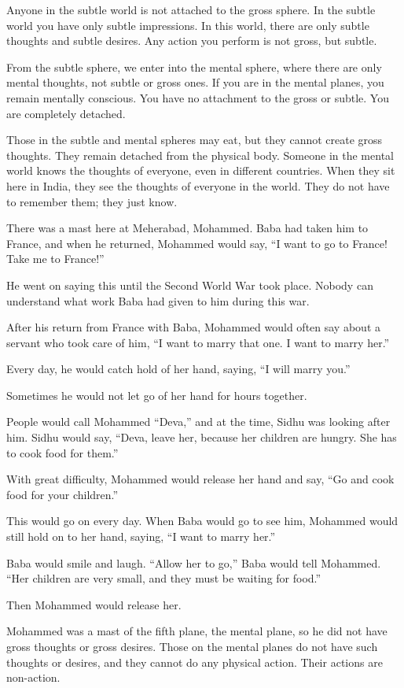 Anyone in the subtle world is not attached to the gross sphere. In the subtle world you have only subtle impressions. In this world, there are only subtle thoughts and subtle desires. Any action you perform is not gross, but subtle.

From the subtle sphere, we enter into the mental sphere, where there are only mental thoughts, not subtle or gross ones. If you are in the mental planes, you remain mentally conscious. You have no attachment to the gross or subtle. You are completely detached.

Those in the subtle and mental spheres may eat, but they cannot create gross thoughts. They remain detached from the physical body. Someone in the mental world knows the thoughts of everyone, even in different countries. When they sit here in India, they see the thoughts of everyone in the world. They do not have to remember them; they just know.

There was a mast here at Meherabad, Mohammed. Baba had taken him to France, and when he returned, Mohammed would say, ``I want to go to France! Take me to France!''

He went on saying this until the Second World War took place. Nobody can understand what work Baba had given to him during this war.

After his return from France with Baba, Mohammed would often say about a servant who took care of him, ``I want to marry that one. I want to marry her.''

Every day, he would catch hold of her hand, saying, ``I will marry you.''

Sometimes he would not let go of her hand for hours together.

People would call Mohammed ``Deva,'' and at the time, Sidhu was looking after him. Sidhu would say, ``Deva, leave her, because her children are hungry. She has to cook food for them.''

With great difficulty, Mohammed would release her hand and say, ``Go and cook food for your children.''

This would go on every day. When Baba would go to see him, Mohammed would still hold on to her hand, saying, ``I want to marry her.''

Baba would smile and laugh. ``Allow her to go,'' Baba would tell Mohammed. ``Her children are very small, and they must be waiting for food.''

Then Mohammed would release her.

Mohammed was a mast of the fifth plane, the mental plane, so he did not have gross thoughts or gross desires. Those on the mental planes do not have such thoughts or desires, and they cannot do any physical action. Their actions are non-action.


